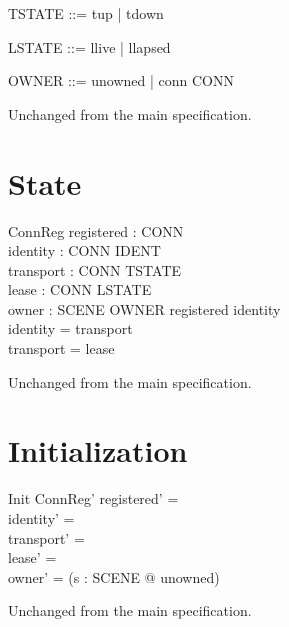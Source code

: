 \documentclass[a4paper,10pt,fleqn]{article}
\begin{document}
\begin{zed}
  TSTATE ::= tup | tdown
\end{zed}

\begin{zed}
  LSTATE ::= llive | llapsed
\end{zed}

\begin{zed}
  OWNER ::= unowned | conn \ldata CONN \rdata
\end{zed}

Unchanged from the main specification.

\section{State}

\begin{schema}{ConnReg}
  registered : \power CONN \\
  identity : CONN \pfun IDENT \\
  transport : CONN \pfun TSTATE \\
  lease : CONN \pfun LSTATE \\
  owner : SCENE \fun OWNER
\where
  registered \subseteq \dom identity \\
  \dom identity = \dom transport \\
  \dom transport = \dom lease
\end{schema}

Unchanged from the main specification.

\section{Initialization}

\begin{schema}{Init}
  ConnReg'
\where
  registered' = \emptyset \\
  identity' = \emptyset \\
  transport' = \emptyset \\
  lease' = \emptyset \\
  owner' = (\lambda s : SCENE @ unowned)
\end{schema}

Unchanged from the main specification.
\end{document}
